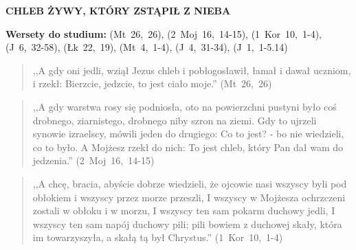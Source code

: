 \documentclass[10pt,a4paper,oneside]{article}
\begin{document}
\centerline{\textbf{\MakeUppercase{Chleb żywy, który zstąpił z nieba}}}
\begin{center}
\textbf{Wersety do studium:} (Mt~26,~26), (2~Moj~16,~14-15), (1~Kor~10,~1-4), (J~6,~32-58), (Łk~22,~19), (Mt~4,~1-4), (J~4,~31-34), (J~1,~1-5.14)
\end{center}
\begin{quote}
,,A gdy oni jedli, wziął Jezus chleb i pobłogosławił, łamał i dawał uczniom, i rzekł: Bierzcie, jedzcie, to jest ciało moje.'' (Mt~26,~26)
\end{quote}
\begin{quote}
,,A gdy warstwa rosy się podniosła, oto na powierzchni pustyni było coś drobnego, ziarnistego, drobnego niby szron na ziemi. Gdy to ujrzeli synowie izraelscy, mówili jeden do drugiego: Co to jest? - bo nie wiedzieli, co to było. A Mojżesz rzekł do nich: To jest chleb, który Pan dał wam do jedzenia.'' (2~Moj~16,~14-15)
\end{quote}
\begin{quote}
,,A chcę, bracia, abyście dobrze wiedzieli, że ojcowie nasi wszyscy byli pod obłokiem i wszyscy przez morze przeszli, I wszyscy w Mojżesza ochrzczeni zostali w obłoku i w morzu, I wszyscy ten sam pokarm duchowy jedli, I wszyscy ten sam napój duchowy pili; pili bowiem z duchowej skały, która im towarzyszyła, a skałą tą był Chrystus.'' (1~Kor~10,~1-4)
\end{quote}
\end{document}
